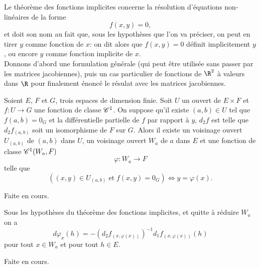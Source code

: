 \documentclass[class=report,crop=false]{standalone}
\begin{document}
\noindent Le th\'eor\`eme des fonctions implicites concerne la r\'esolution d'\'equations non-lin\'eaires de la forme
\begin{equation*}
  f(x,y)=0,
\end{equation*}
et doit son nom au fait que, sous les hypoth\`eses que l'on va pr\'eciser, on peut en tirer $y$ comme
fonction de $x$: on dit alors que $f(x,y)=0$ d\'efinit implicitement $y$, ou encore $y$ comme
fonction implicite de $x$.\\
Donnons d'abord une formulation générale (qui peut être utilisée sans passer par les matrices jacobiennes),
puis un cas particulier de fonctions de $\R^2$ à valeurs dans $\R$ pour finalement énoncé le résulat avec les matrices jacobiennes.




\begin{theoreme}\textcolor[rgb]{0.44,0.00,0.87}{
 Soient $E$, $F$ et $G$, trois espaces de dimension finie.  Soit $U$ un ouvert de $E \times F$ et $f: U \rightarrow G$ une fonction de classe
$\mathscr{C}^1$. On suppose qu'il existe $(a,b)  \in U$ tel que $f(a,b)=0_G$ et la diff\'erentielle partielle de $f$ par rapport \`a $y$,
$d_2f$ est telle que $d_2f_{(a,b)}$ soit un isomorphisme de $F$ sur $G$. Alors
il existe un voisinage ouvert $U_{(a,b)}$ de $(a,b)$ dans $U$, un voisinage ouvert $W_a$ de $a$ dans $E$ et une fonction de classe $\mathscr{C}^1(W_a,F)$
\begin{equation*}
  \varphi: W_a \rightarrow F
\end{equation*}
telle que
\begin{equation*}
  ((x,y) \in U_{(a,b)} \;\mathrm{et}\; f(x,y)=0_G)\Leftrightarrow y=\varphi(x).
\end{equation*} }
\end{theoreme}

 Faite en cours.

\begin{proposition} \textcolor[rgb]{0.44,0.00,0.87}{
Sous les hypoth\`eses du th\'eor\`eme des fonctions implicites, et quitte \`a r\'eduire $W_a$ on a
\begin{equation*}
  d\varphi_x(h)=-(d_2f_{(x,\varphi(x))})^{-1}d_1f_{(x,\varphi(x))}(h)
\end{equation*}
pour tout $x \in W_a$ et pour tout $h \in E$.}
\end{proposition}

 Faite en cours.
\end{document}
